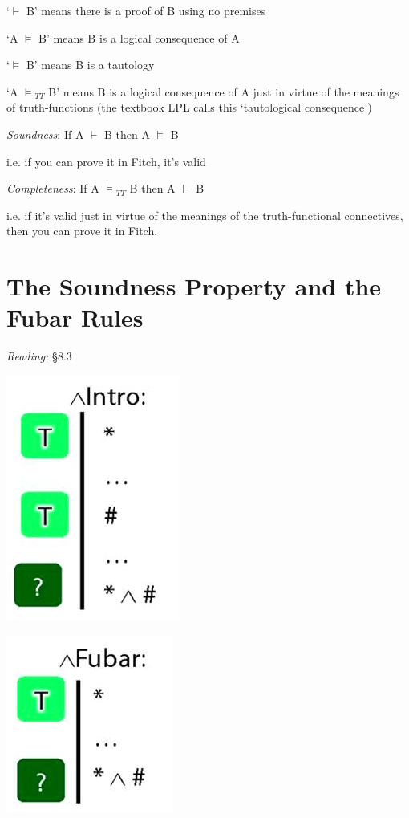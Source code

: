 \documentclass[12pt]{extarticle}
\begin{document}
\begin{multicols*}{3}
‘$\vdash$ B’ means there is a proof of B using no premises
 
‘A $\models$ B’ means B is a logical consequence of A
 
‘$\models$ B’ means B is a tautology
 
‘A $\models$$_{TT}$ B’ means B is a logical consequence of A just in virtue of the meanings of truth-functions (the textbook LPL calls this ‘tautological consequence’)
 
\emph{Soundness}: If A $\vdash$ B then A $\models$ B
 
\hspace{3mm} i.e. if you can prove it in Fitch, it’s valid
 
\emph{Completeness}: If A $\models$$_{TT}$ B then A $\vdash$ B
 
\hspace{3mm} i.e. if it’s valid just in virtue of the meanings of the truth-functional connectives, then you can prove it in Fitch.
 
 
 
\section{The Soundness Property and the Fubar Rules}
 
\emph{Reading:} §8.3
 
\begin{center}
\includegraphics[scale=0.3]{img/unit_346_and.png}
\end{center}
\begin{center}
\includegraphics[scale=0.3]{img/unit_346_fubar.png}
\end{center}
 

\end{multicols*}
\end{document}
